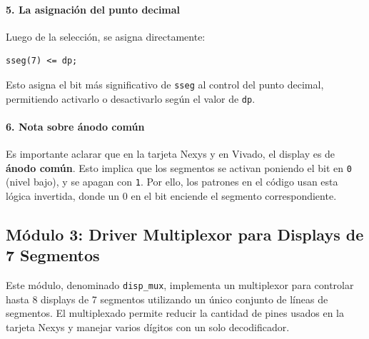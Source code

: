 \documentclass[a4paper,12pt]{article}
\begin{document}
\paragraph{5. La asignación del punto decimal}

Luego de la selección, se asigna directamente:

\begin{lstlisting}[basicstyle=\ttfamily\footnotesize]
sseg(7) <= dp;
\end{lstlisting}

Esto asigna el bit más significativo de \texttt{sseg} al control del punto decimal, permitiendo activarlo o desactivarlo según el valor de \texttt{dp}.

\paragraph{6. Nota sobre ánodo común}

Es importante aclarar que en la tarjeta Nexys y en Vivado, el display es de \textbf{ánodo común}. Esto implica que los segmentos se activan poniendo el bit en \texttt{0} (nivel bajo), y se apagan con \texttt{1}.  
Por ello, los patrones en el código usan esta lógica invertida, donde un 0 en el bit enciende el segmento correspondiente.

\subsection{Módulo 3: Driver Multiplexor para Displays de 7 Segmentos}

Este módulo, denominado \texttt{disp\_mux}, implementa un multiplexor para controlar hasta 8 displays de 7 segmentos utilizando un único conjunto de líneas de segmentos.  
El multiplexado permite reducir la cantidad de pines usados en la tarjeta Nexys y manejar varios dígitos con un solo decodificador.

\newpage
\end{document}

